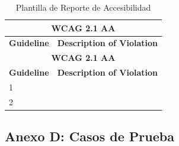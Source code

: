 \documentclass[stu, 12pt, letterpaper, donotrepeattitle, floatsintext, natbib]{apa7}
\begin{document}
\begin{longtable}{|p{3cm}|p{10cm}|}
    \caption{Plantilla de Reporte de Accesibilidad} \label{tab:reporte_accesibilidad} \\
    \hline
    \multicolumn{2}{|c|}{\textbf{WCAG 2.1 AA}} \\ \hline
    \textbf{Guideline} & \textbf{Description of Violation} \\ \hline
    \endfirsthead

    \hline
    \multicolumn{2}{|c|}{\textbf{WCAG 2.1 AA}} \\ \hline
    \textbf{Guideline} & \textbf{Description of Violation} \\ \hline
    \endhead

    1 &  \\ \hline
    2 &  \\ \hline
\end{longtable}


    
\clearpage
\subsection{Anexo D: Casos de Prueba}

\small %
\renewcommand{\arraystretch}{1.0} %
\setlength{\tabcolsep}{4pt} %
\end{document}
